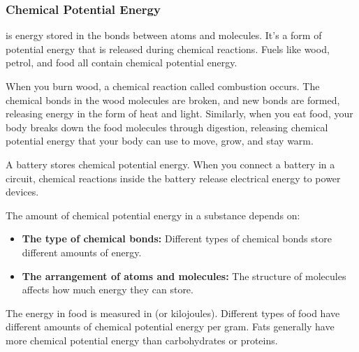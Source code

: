 \subsubsection{Chemical Potential Energy}

 is energy stored in the bonds between atoms and molecules.  It’s a form of potential energy that is released during chemical reactions.  Fuels like wood, petrol, and food all contain chemical potential energy.


When you burn wood, a chemical reaction called combustion occurs.  The chemical bonds in the wood molecules are broken, and new bonds are formed, releasing energy in the form of heat and light.  Similarly, when you eat food, your body breaks down the food molecules through digestion, releasing chemical potential energy that your body can use to move, grow, and stay warm.

\begin{example}
A battery stores chemical potential energy. When you connect a battery in a circuit, chemical reactions inside the battery release electrical energy to power devices.
\end{example}

The amount of chemical potential energy in a substance depends on:

\begin{itemize}
    \item \textbf{The type of chemical bonds:} Different types of chemical bonds store different amounts of energy.
    \item \textbf{The arrangement of atoms and molecules:} The structure of molecules affects how much energy they can store.
\end{itemize}

\begin{marginnote}
The energy in food is measured in  (or kilojoules).  Different types of food have different amounts of chemical potential energy per gram.  Fats generally have more chemical potential energy than carbohydrates or proteins.
\end{marginnote}

